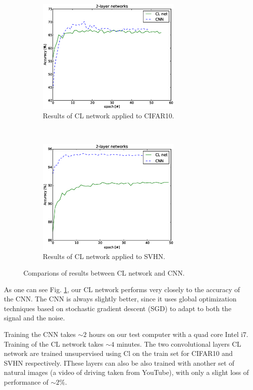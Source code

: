 \documentclass{article} %
\begin{document}
\begin{figure}
        \centering
        \begin{subfigure}[b]{0.5\textwidth}
                \centering
                \includegraphics[width=2.8in]{fig-cifar10-clnet.eps}
                \caption{Results of CL network applied to CIFAR10.}
        \end{subfigure}%
        ~%
        \begin{subfigure}[b]{0.5\textwidth}
                \centering
                \includegraphics[width=2.8in]{fig-svhn-clnet.eps}
                \caption{Results of CL network applied to SVHN.}
        \end{subfigure}
        \caption{Comparions of results between CL network and CNN.}
        \label{fig-results1}
\end{figure}


As one can see Fig. \ref{fig-results1}, our CL network performs very closely to the accuracy of the CNN. The CNN is always slightly better, since it uses global optimization techniques based on stochastic gradient descent (SGD) to adapt to both the signal and the noise. 

Training the CNN takes $\sim 2$ hours on our test computer with a quad core Intel i7. Training of the CL network takes $\sim 4$ minutes.
The two convolutional layers CL network are trained unsupervised using Cl on the train set for CIFAR10 and SVHN respectively. IThese layers can also be also trained with another set of natural images (a video of driving taken from YouTube), with only a slight loss of performance of $\sim 2\%$. 
\end{document}

